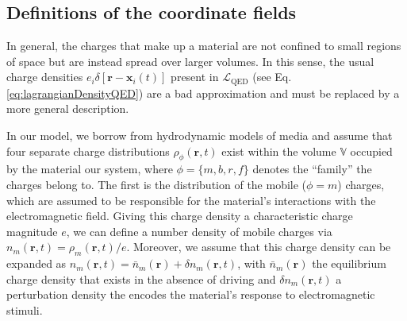 \documentclass{article}
\begin{document}
\subsection{Definitions of the coordinate fields}\label{sec:coordinateFields}

In general, the charges that make up a material are not confined to small regions of space but are instead spread over larger volumes. In this sense, the usual charge densities $e_i\delta[\mathbf{r} - \mathbf{x}_i(t)]$ present in $\mathcal{L}_\mathrm{QED}$ (see Eq. \eqref{eq:lagrangianDensityQED}) are a bad approximation and must be replaced by a more general description. 

In our model, we borrow from hydrodynamic models of media and assume that four separate charge distributions $\rho_\phi(\mathbf{r},t)$ exist within the volume $\mathbb{V}$ occupied by the material our system, where $\phi = \{m,b,r,f\}$ denotes the ``family'' the charges belong to. The first is the distribution of the mobile ($\phi = m$) charges, which are assumed to be responsible for the material's interactions with the electromagnetic field. Giving this charge density a characteristic charge magnitude $e$, we can define a number density of mobile charges via $n_m(\mathbf{r},t) = \rho_m(\mathbf{r},t)/e$. Moreover, we assume that this charge density can be expanded as $n_m(\mathbf{r},t) = \bar{n}_m(\mathbf{r}) + \delta n_m(\mathbf{r},t)$, with $\bar{n}_m(\mathbf{r})$ the equilibrium charge density that exists in the absence of driving and $\delta n_m(\mathbf{r},t)$ a perturbation density the encodes the material's response to electromagnetic stimuli.
\end{document}
